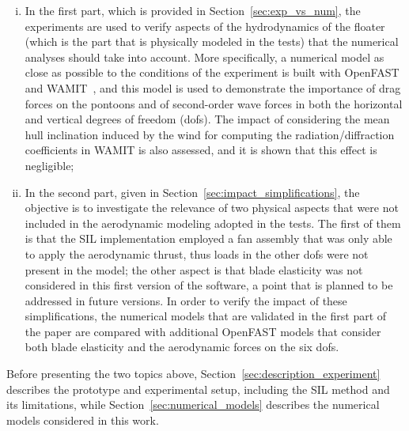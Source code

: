 \begin{enumerate}[i.]
    \item In the first part, which is provided in Section~\ref{sec:exp_vs_num}, the experiments are used to verify aspects of the hydrodynamics of the floater (which is the part that is physically modeled in the tests) that the numerical analyses should take into account. More specifically, a numerical model as close as possible to the conditions of the experiment is built with OpenFAST~\citep{jonkman2005fast} and WAMIT~\citep{wamitManual}, and this model is used to demonstrate the importance of drag forces on the pontoons and of second-order wave forces in both the horizontal and vertical degrees of freedom (dofs). The impact of considering the mean hull inclination induced by the wind for computing the radiation/diffraction coefficients in WAMIT is also assessed, and it is shown that this effect is negligible;    
    \item In the second part, given in Section~\ref{sec:impact_simplifications}, the objective is to investigate the relevance of two physical aspects that were not included in the aerodynamic modeling adopted in the tests. The first of them is that the SIL implementation employed a fan assembly that was only able to apply the aerodynamic thrust, thus loads in the other dofs were not present in the model; the other aspect is that blade elasticity was not considered in this first version of the software, a point that is planned to be addressed in future versions. In order to verify the impact of these simplifications, the numerical models that are validated in the first part of the paper are compared with additional OpenFAST models that consider both blade elasticity and the aerodynamic forces on the six dofs.
\end{enumerate}

Before presenting the two topics above, Section~\ref{sec:description_experiment} describes the prototype and experimental setup, including the SIL method and its limitations, while Section~\ref{sec:numerical_models} describes the numerical models considered in this work. 